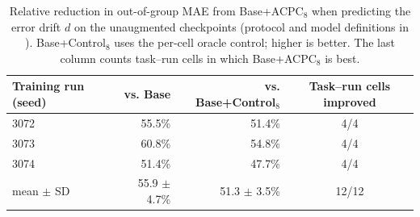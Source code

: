 \begin{table}[t]
\centering
\caption{Relative reduction in out-of-group MAE from Base+ACPC$_8$ when predicting the error drift $d$ on the unaugmented checkpoints (protocol and model definitions in ). Base+Control$_8$ uses the per-cell oracle control; higher is better. The last column counts task--run cells in which Base+ACPC$_8$ is best.}
\label{tab:target-aligned-acpc}
\small
\setlength{\tabcolsep}{6pt}
\begin{tabular}{lrrc}
\toprule
Training run (seed) & vs. Base & vs. Base+Control$_8$ & Task--run cells improved \\
\midrule
3072 & 55.5\% & 51.4\% & 4/4 \\
3073 & 60.8\% & 54.8\% & 4/4 \\
3074 & 51.4\% & 47.7\% & 4/4 \\
\midrule
mean $\pm$ SD & 55.9 $\pm$ 4.7\% & 51.3 $\pm$ 3.5\% & 12/12 \\
\bottomrule
\end{tabular}
\end{table}
